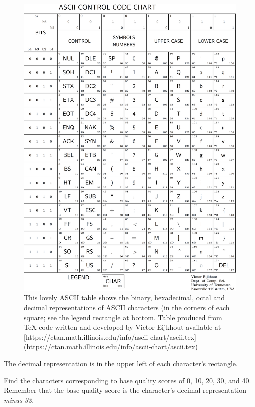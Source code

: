 \documentclass[]{krantz}
\begin{document}
\begin{figure}

{\centering \includegraphics{figs/ascii-crop} 

}

\caption{This lovely ASCII table shows the binary, hexadecimal, octal and decimal representations of ASCII characters (in the corners of each square; see the legend rectangle at bottom.  Table produced from TeX code written and developed by Victor Eijkhout available at [https://ctan.math.illinois.edu/info/ascii-chart/ascii.tex](https://ctan.math.illinois.edu/info/ascii-chart/ascii.tex)}\label{fig:ascii}
\end{figure}

The decimal representation is in the upper left of each character's rectangle.

Find the characters corresponding to base quality scores of 0, 10, 20, 30, and 40. Remember that the
base quality score is the character's decimal representation \emph{minus 33}.
\end{document}
